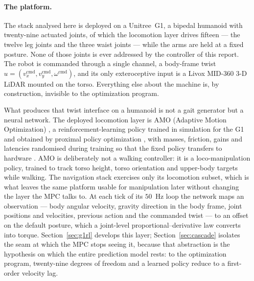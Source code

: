 \documentclass[11pt,a4paper]{article}
\begin{document}
\paragraph{The platform.}
The stack analysed here is deployed on a Unitree~G1, a bipedal humanoid with twenty-nine actuated joints, of
which the locomotion layer drives fifteen --- the twelve leg joints and the three waist joints --- while the
arms are held at a fixed posture. None of those joints is ever addressed by the controller of this report.
The robot is commanded through a single channel, a body-frame twist
$u=(v_x^{\mathrm{cmd}},v_y^{\mathrm{cmd}},\omega^{\mathrm{cmd}})$, and its only exteroceptive input is a
Livox MID-360 3-D LiDAR mounted on the torso. Everything else about the machine is, by construction,
invisible to the optimization program.

What produces that twist interface on a humanoid is not a gait generator but a neural network. The deployed
locomotion layer is AMO (Adaptive Motion Optimization) \cite{li2025amo}, a reinforcement-learning policy
trained in simulation for the G1 and obtained by proximal policy optimization \cite{schulman2017ppo}, with
masses, friction, gains and latencies randomised during training so that the fixed policy transfers to
hardware \cite{rudin2022walk}. AMO is deliberately not a walking controller: it is a loco-manipulation
policy, trained to track torso height, torso orientation and upper-body targets while walking. The
navigation stack exercises only its locomotion subset, which is what leaves the same platform usable for
manipulation later without changing the layer the MPC talks to. At each tick of its $50$~Hz loop the network
maps an observation --- body angular velocity, gravity direction in the body frame, joint positions and
velocities, previous action and the commanded twist --- to an offset on the default posture, which a
joint-level proportional--derivative law converts into torque. Section~\ref{sec:g1rl} develops this layer;
Section~\ref{sec:cascade} isolates the seam at which the MPC stops seeing it, because that abstraction is the
hypothesis on which the entire prediction model rests: to the optimization program, twenty-nine degrees of
freedom and a learned policy reduce to a first-order velocity lag.
\end{document}
